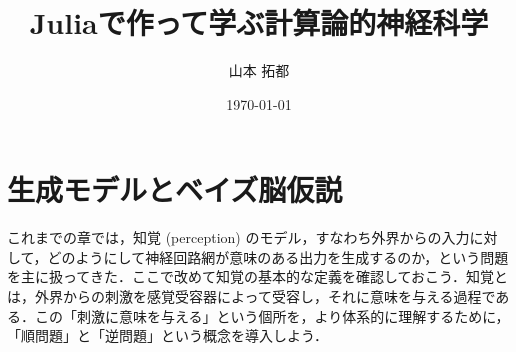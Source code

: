 \documentclass[titlepage]{ltjsbook}
\title{\Huge \textbf{Juliaで作って学ぶ計算論的神経科学}}
\author{\huge 山本 拓都}
\date{\huge \today}
\begin{document}
\setcounter{tocdepth}{2}
\tableofcontents
\clearpage
\chapter{生成モデルとベイズ脳仮説}
これまでの章では，知覚 (perception) のモデル，すなわち外界からの入力に対して，どのようにして神経回路網が意味のある出力を生成するのか，という問題を主に扱ってきた．ここで改めて知覚の基本的な定義を確認しておこう．知覚とは，外界からの刺激を感覚受容器によって受容し，それに意味を与える過程である．この「刺激に意味を与える」という個所を，より体系的に理解するために，「順問題」と「逆問題」という概念を導入しよう．
\end{document}
